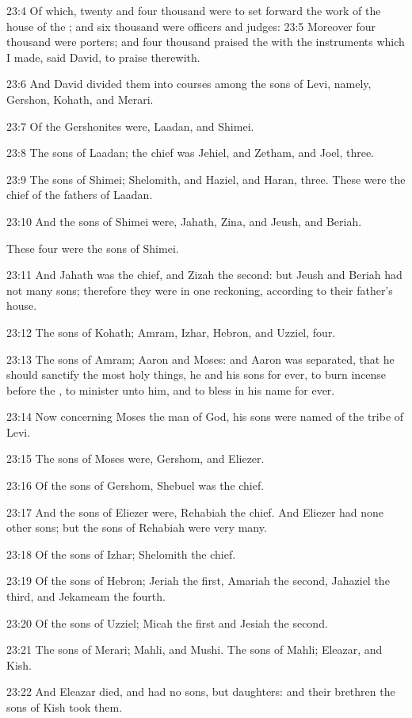 23:4 Of which, twenty and four thousand were to set forward the work
of the house of the \LORD; and six thousand were officers and judges:
23:5 Moreover four thousand were porters; and four thousand praised
the \LORD with the instruments which I made, said David, to praise
therewith.

23:6 And David divided them into courses among the sons of Levi,
namely, Gershon, Kohath, and Merari.

23:7 Of the Gershonites were, Laadan, and Shimei.

23:8 The sons of Laadan; the chief was Jehiel, and Zetham, and Joel,
three.

23:9 The sons of Shimei; Shelomith, and Haziel, and Haran, three.
These were the chief of the fathers of Laadan.

23:10 And the sons of Shimei were, Jahath, Zina, and Jeush, and
Beriah.

These four were the sons of Shimei.

23:11 And Jahath was the chief, and Zizah the second: but Jeush and
Beriah had not many sons; therefore they were in one reckoning,
according to their father's house.

23:12 The sons of Kohath; Amram, Izhar, Hebron, and Uzziel, four.

23:13 The sons of Amram; Aaron and Moses: and Aaron was separated,
that he should sanctify the most holy things, he and his sons for
ever, to burn incense before the \LORD, to minister unto him, and to
bless in his name for ever.

23:14 Now concerning Moses the man of God, his sons were named of the
tribe of Levi.

23:15 The sons of Moses were, Gershom, and Eliezer.

23:16 Of the sons of Gershom, Shebuel was the chief.

23:17 And the sons of Eliezer were, Rehabiah the chief. And Eliezer
had none other sons; but the sons of Rehabiah were very many.

23:18 Of the sons of Izhar; Shelomith the chief.

23:19 Of the sons of Hebron; Jeriah the first, Amariah the second,
Jahaziel the third, and Jekameam the fourth.

23:20 Of the sons of Uzziel; Micah the first and Jesiah the second.

23:21 The sons of Merari; Mahli, and Mushi. The sons of Mahli;
Eleazar, and Kish.

23:22 And Eleazar died, and had no sons, but daughters: and their
brethren the sons of Kish took them.

